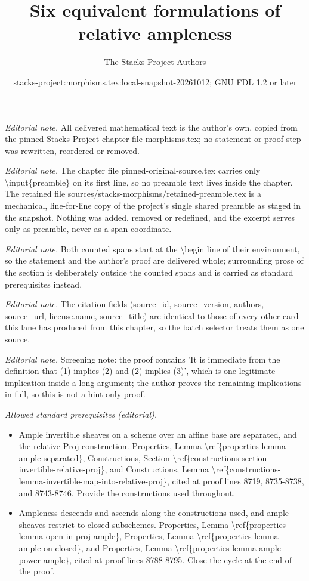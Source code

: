 \documentclass[10pt,a4paper]{amsart}
\title{Six equivalent formulations of relative ampleness}
\author{The Stacks Project Authors}
\date{stacks-project:morphisms.tex:local-snapshot-20261012; GNU FDL 1.2 or later}
\theoremstyle{plain}
\theoremstyle{definition}
\theoremstyle{remark}
\numberwithin{equation}{subsection}
\begin{document}
\maketitle
\setcounter{subsection}{1}
\noindent\textit{Editorial note.} All delivered mathematical text is the author's own, copied from the pinned Stacks Project chapter file morphisms.tex; no statement or proof step was rewritten, reordered or removed.\par\medskip
\noindent\textit{Editorial note.} The chapter file pinned-original-source.tex carries only \textbackslash{}input\{preamble\} on its first line, so no preamble text lives inside the chapter. The retained file sources/stacks-morphisms/retained-preamble.tex is a mechanical, line-for-line copy of the project's single shared preamble as staged in the snapshot. Nothing was added, removed or redefined, and the excerpt serves only as preamble, never as a span coordinate.\par\medskip
\noindent\textit{Editorial note.} Both counted spans start at the \textbackslash{}begin line of their environment, so the statement and the author's proof are delivered whole; surrounding prose of the section is deliberately outside the counted spans and is carried as standard prerequisites instead.\par\medskip
\noindent\textit{Editorial note.} The citation fields (source\_id, source\_version, authors, source\_url, license.name, source\_title) are identical to those of every other card this lane has produced from this chapter, so the batch selector treats them as one source.\par\medskip
\noindent\textit{Editorial note.} Screening note: the proof contains 'It is immediate from the definition that (1) implies (2) and (2) implies (3)', which is one legitimate implication inside a long argument; the author proves the remaining implications in full, so this is not a hint-only proof.\par\medskip
\noindent\textit{Allowed standard prerequisites (editorial).}\begin{itemize}
\item Ample invertible sheaves on a scheme over an affine base are separated, and the relative Proj construction. Properties, Lemma \textbackslash{}ref\{properties-lemma-ample-separated\}, Constructions, Section \textbackslash{}ref\{constructions-section-invertible-relative-proj\}, and Constructions, Lemma \textbackslash{}ref\{constructions-lemma-invertible-map-into-relative-proj\}, cited at proof lines 8719, 8735-8738, and 8743-8746. Provide the constructions used throughout.
\item Ampleness descends and ascends along the constructions used, and ample sheaves restrict to closed subschemes. Properties, Lemma \textbackslash{}ref\{properties-lemma-open-in-proj-ample\}, Properties, Lemma \textbackslash{}ref\{properties-lemma-ample-on-closed\}, and Properties, Lemma \textbackslash{}ref\{properties-lemma-ample-power-ample\}, cited at proof lines 8788-8795. Close the cycle at the end of the proof.
\end{itemize}\medskip
\end{document}
